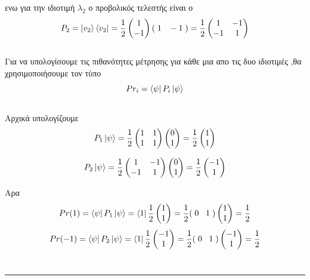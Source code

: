 \documentclass[12pt]{article}
\begin{document}
ενω για την ιδιοτιμή $\lambda_2$ ο προβολικός τελεστής είναι ο
$$ P_2 = \ket{v_2}\bra{v_2} = \frac{1}{2}\begin{pmatrix}
    1\\-1
\end{pmatrix}(\;1\;\;\;-1\;) = \frac{1}{2}\begin{pmatrix}
    1&-1\\-1&1
\end{pmatrix}$$\\
Για να υπολογίσουμε τις πιθανότητες μέτρησης για κάθε μια απο τις δυο ιδιοτιμές ,θα χρησιμοποιήσουμε τον τύπο
$$Pr_i = \bra{\psi}P_i\ket{\psi} $$ \\
Αρχικά υπολογίζουμε 
$$ P_1\ket{\psi} = \frac{1}{2} \begin{pmatrix}
    1&1\\1&1
\end{pmatrix}\begin{pmatrix}
    0\\1
\end{pmatrix} = \frac{1}{2}\begin{pmatrix}
    1\\1
\end{pmatrix} $$

$$ P_2\ket{\psi} = \frac{1}{2} \begin{pmatrix}
    1&-1\\-1&1
\end{pmatrix}\begin{pmatrix}
    0\\1
\end{pmatrix} = \frac{1}{2}\begin{pmatrix}
    -1\\1
\end{pmatrix} $$

Αρα 
$$Pr(1) = \bra{\psi}P_1\ket{\psi} = \bra{1}\frac{1}{2}\begin{pmatrix}
    1\\1
\end{pmatrix} = \frac{1}{2}(\;0\;\;\;1\;)\begin{pmatrix}
    1\\1
\end{pmatrix}  =  \frac{1}{2}$$
$$Pr(-1) = \bra{\psi}P_2\ket{\psi} = \bra{1}\frac{1}{2}\begin{pmatrix}
    -1\\1
\end{pmatrix} = \frac{1}{2}(\;0\;\;\;1\;)\begin{pmatrix}
    -1\\1
\end{pmatrix}  =  \frac{1}{2}$$
\\\rule{\textwidth}{.5pt}
\end{document}
